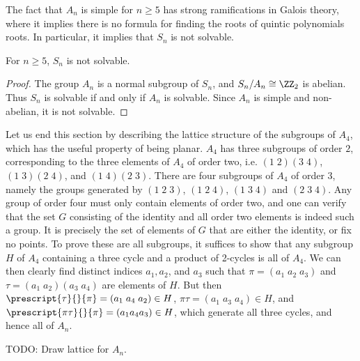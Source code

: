 The fact that $A_n$ is simple for $n \geq 5$ has strong ramifications in Galois theory, where it implies there is no formula for finding the roots of quintic polynomials roots. In particular, it implies that $S_n$ is not solvable.

\begin{theorem}
    For $n \geq 5$, $S_n$ is not solvable.
\end{theorem}
\begin{proof}
    The group $A_n$ is a normal subgroup of $S_n$, and $S_n/A_n \cong \ZZ_2$ is abelian. Thus $S_n$ is solvable if and only if $A_n$ is solvable. Since $A_n$ is simple and non-abelian, it is not solvable.
\end{proof}

Let us end this section by describing the lattice structure of the subgroups of $A_4$, which has the useful property of being planar. $A_4$ has three subgroups of order $2$, corresponding to the three elements of $A_4$ of order two, i.e. $(1\; 2)(3\; 4)$, $(1\; 3)(2\; 4)$, and $(1\; 4)(2\; 3)$. There are four subgroups of $A_4$ of order 3, namely the groups generated by $(1\; 2\; 3)$, $(1\; 2\; 4)$, $(1\; 3\; 4)$ and $(2\; 3\; 4)$. Any group of order four must only contain elements of order two, and one can verify that the set $G$ consisting of the identity and all order two elements is indeed such a group. It is precisely the set of elements of $G$ that are either the identity, or fix no points. To prove these are all subgroups, it suffices to show that any subgroup $H$ of $A_4$ containing a three cycle and a product of 2-cycles is all of $A_4$. We can then clearly find distinct indices $a_1, a_2$, and $a_3$ such that $\pi = (a_1\; a_2\; a_3)$ and $\tau = (a_1\; a_2)(a_3\; a_4)$ are elements of $H$. But then $\prescript{\tau}{}{\pi} = (a_1\; a_4\; a_2) \in H$, $\pi \tau = (a_1\; a_3\; a_4) \in H$, and $\prescript{\pi \tau}{}{\pi} = (a_1 a_4 a_3) \in H$, which generate all three cycles, and hence all of $A_n$.

TODO: Draw lattice for $A_n$.

